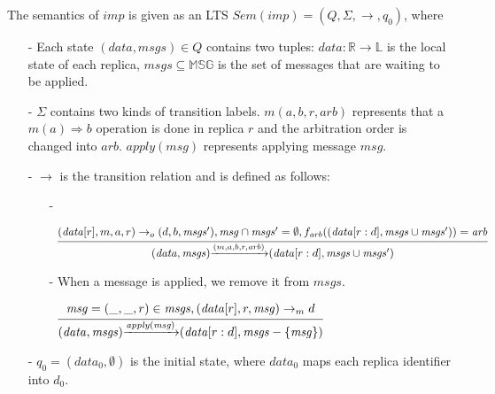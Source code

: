 The semantics of $\mathit{imp}$ is given as an LTS $\mathit{Sem}(\mathit{imp}) = (Q,\Sigma,\rightarrow,q_0)$, where

\begin{itemize}
\setlength{\itemsep}{0.5pt}
\item[-] Each state $(\mathit{data},\mathit{msgs}) \in Q$ contains two tuples: $\mathit{data}: \mathbb{R} \rightarrow \mathbb{L}$ is the local state of each replica, $\mathit{msgs} \subseteq \mathbb{MSG}$ is the set of messages that are waiting to be applied.  

\item[-] $\Sigma$ contains two kinds of transition labels. $m(a,b,r,\mathit{arb})$ represents that a $m(a) \Rightarrow b$ operation is done in replica $r$ and the arbitration order is changed into $\mathit{arb}$. $\mathit{apply}(\mathit{msg})$ represents applying message $\mathit{msg}$. 

\item[-] $\rightarrow$ is the transition relation and is defined as follows:

    \begin{itemize}
    \setlength{\itemsep}{0.5pt}
    \item[-] %

    $\begin{array}{l c} \bigfrac{ (\mathit{data}[r],m,a,r) \rightarrow_o (d,b,\mathit{msgs}'), \mathit{msg} \cap \mathit{msgs}' = \emptyset, f_{\mathit{arb}}((\mathit{data}[r:d], \mathit{msgs} \cup \mathit{msgs}')) = \mathit{arb}} {(\mathit{data},\mathit{msgs}) {\xrightarrow{(m,a,b,r,\mathit{arb})}} (\mathit{data}[r:d], \mathit{msgs} \cup \mathit{msgs}')} \end{array}$

    \item[-] {\color {red} When a message is applied, we remove it from $\mathit{msgs}$.}

    $\begin{array}{l c} \bigfrac{ \mathit{msg} = (\_,\_,r) \in \mathit{msgs},(\mathit{data}[r],r,\mathit{msg}) \rightarrow_m d } {(\mathit{data},\mathit{msgs}) {\xrightarrow{\mathit{apply}(\mathit{msg})}} (\mathit{data}[r:d],\mathit{msgs} - \{ \mathit{msg} \})} \end{array}$
    \end{itemize}

\item[-] $q_0 = (data_0,\emptyset)$ is the initial state, where $data_0$ maps each replica identifier into $d_0$.
\end{itemize}

